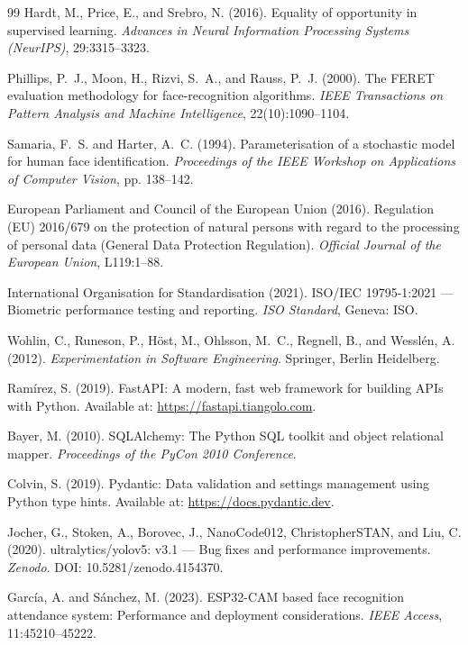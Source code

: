 \documentclass[12pt,a4paper]{report}
\begin{document}
\begin{thebibliography}{99}
Hardt, M., Price, E., and Srebro, N. (2016).
\newblock Equality of opportunity in supervised learning.
\newblock \textit{Advances in Neural Information Processing Systems (NeurIPS)}, 29:3315--3323.

Phillips, P.~J., Moon, H., Rizvi, S.~A., and Rauss, P.~J. (2000).
\newblock The FERET evaluation methodology for face-recognition algorithms.
\newblock \textit{IEEE Transactions on Pattern Analysis and Machine Intelligence}, 22(10):1090--1104.

Samaria, F.~S. and Harter, A.~C. (1994).
\newblock Parameterisation of a stochastic model for human face identification.
\newblock \textit{Proceedings of the IEEE Workshop on Applications of Computer Vision}, pp. 138--142.

European Parliament and Council of the European Union (2016).
\newblock Regulation (EU) 2016/679 on the protection of natural persons with regard to the processing of personal data (General Data Protection Regulation).
\newblock \textit{Official Journal of the European Union}, L119:1--88.

International Organisation for Standardisation (2021).
\newblock ISO/IEC 19795-1:2021 — Biometric performance testing and reporting.
\newblock \textit{ISO Standard}, Geneva: ISO.

Wohlin, C., Runeson, P., H{\"o}st, M., Ohlsson, M.~C., Regnell, B., and Wessl{\'e}n, A. (2012).
\newblock \textit{Experimentation in Software Engineering}.
\newblock Springer, Berlin Heidelberg.

Ram{\'i}rez, S. (2019).
\newblock FastAPI: A modern, fast web framework for building APIs with Python.
\newblock Available at: \url{https://fastapi.tiangolo.com}.

Bayer, M. (2010).
\newblock SQLAlchemy: The Python SQL toolkit and object relational mapper.
\newblock \textit{Proceedings of the PyCon 2010 Conference}.

Colvin, S. (2019).
\newblock Pydantic: Data validation and settings management using Python type hints.
\newblock Available at: \url{https://docs.pydantic.dev}.

Jocher, G., Stoken, A., Borovec, J., NanoCode012, ChristopherSTAN, and Liu, C. (2020).
\newblock ultralytics/yolov5: v3.1 — Bug fixes and performance improvements.
\newblock \textit{Zenodo}. DOI: 10.5281/zenodo.4154370.

Garc{\'i}a, A. and S{\'a}nchez, M. (2023).
\newblock ESP32-CAM based face recognition attendance system: Performance and deployment considerations.
\newblock \textit{IEEE Access}, 11:45210--45222.

\end{thebibliography}
\end{document}
